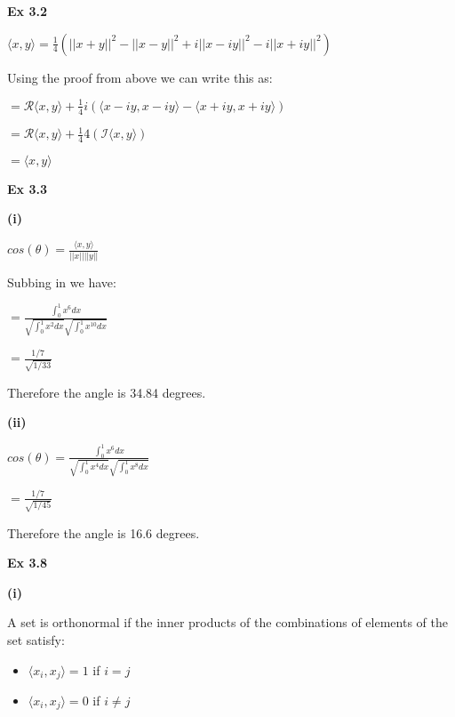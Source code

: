 \documentclass[letterpaper,12pt]{article}
\theoremstyle{definition}
\begin{document}
\begin{spacing}{1.3}{}
	\setlength{\leftskip}{0pt}
	
	\textbf{Ex 3.2}
	
	\setlength{\leftskip}{20pt}
	
	$\langle x, y \rangle = \frac{1}{4}(||x + y||^2 - ||x - y||^2 + i||x - iy||^2 - i||x + iy||^2)$
	
	Using the proof from above we can write this as:
	
	$= \mathcal{R} \langle x, y \rangle +\frac{1}{4}i(\langle x-iy, x-iy \rangle - \langle x+iy, x+iy \rangle)$
	
	$= \mathcal{R} \langle x, y \rangle +\frac{1}{4}4( \mathcal{I} \langle x, y \rangle)$
	
	$= \langle x, y \rangle$
	
	\setlength{\leftskip}{0pt}
	
	\textbf{Ex 3.3}
	
	\setlength{\leftskip}{10pt}
	
	\textbf{(i)}
	
	\setlength{\leftskip}{20pt}
	
	$cos(\theta) = \frac{\langle x, y \rangle}{||x|| ||y||}$
	
	Subbing in we have:
	
	$= \frac{\int_{0}^{1} x^6 dx}{\sqrt{\int_{0}^{1} x^2 dx}\sqrt{\int_{0}^{1} x^10 dx}}$
	
	$= \frac{1/7}{\sqrt{1/33}}$
	
	Therefore the angle is 34.84 degrees.
	
	\setlength{\leftskip}{10pt}
	
	\textbf{(ii)}
	
	\setlength{\leftskip}{20pt}
	
	$cos(\theta) = \frac{\int_{0}^{1}x^6 dx}{\sqrt{\int_{0}^{1}x^4 dx}\sqrt{\int_{0}^{1}x^8 dx}}$
	
	$= \frac{1/7}{\sqrt{1/45}}$
	
	Therefore the angle is 16.6 degrees.
	
	\setlength{\leftskip}{0pt}
	
	\textbf{Ex 3.8}
	
	\setlength{\leftskip}{10pt}
	
	\textbf{(i)}
	
	\setlength{\leftskip}{20pt}
	
	A set is orthonormal if the inner products of the combinations of elements of the set satisfy: \begin{itemize} \item $\langle x_{i}, x_{j} \rangle = 1$ if $i=j$ \item $\langle x_{i}, x_{j} \rangle = 0$ if $i \neq j$ \end{itemize}
	

\end{spacing}
\end{document}

